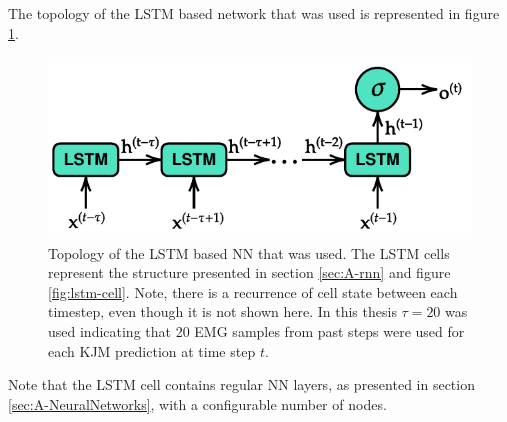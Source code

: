 \documentclass[../main.tex]{subfiles}
\begin{document}
The topology of the \ac{LSTM} based network that was used is represented in figure \ref{fig:lstm-model-used}.
\begin{figure}[!htb]
    \centering
    \includegraphics{img/LSTM_model_used.pdf}
    \caption{Topology of the \ac{LSTM} based \ac{NN} that was used. The \ac{LSTM} cells represent the structure presented in section \ref{sec:A-rnn} and figure \ref{fig:lstm-cell}. Note, there is a recurrence of cell state between each timestep, even though it is not shown here. In this thesis $\tau = 20$ was used indicating that 20 \ac{EMG} samples from past steps were used for each \ac{KJM} prediction at time step $t$.}
    \label{fig:lstm-model-used}
\end{figure}
Note that the \ac{LSTM} cell contains regular \ac{NN} layers, as presented in section \ref{sec:A-NeuralNetworks}, with a configurable number of nodes.
\end{document}
